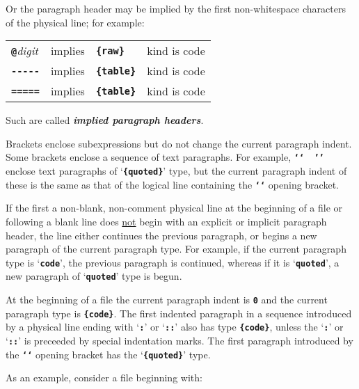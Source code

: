 \documentclass[12pt]{article}
\newcommand{\TT}[1]{{\tt \bfseries #1}}
\newcommand{\skey}[2]{{\bf \em #1#2}\index{#1}}
\begin{document}
Or the paragraph header may be implied by the first non-whitespace
characters of the physical line; for example:
\begin{center}
\begin{tabular}{llll}
\TT{*@}{\em digit}	& implies	& \TT{\{raw\}} 	  & kind is code \\
\TT{-{}-{}-{}-{}-}	& implies	& \TT{\{table\}}  & kind is code \\
\TT{={}={}={}={}=}	& implies	& \TT{\{table\}}  & kind is code \\
\end{tabular}
\end{center}
Such are called \skey{implied paragraph header}s.

Brackets enclose subexpressions but do not
change the current paragraph indent.
Some brackets enclose a sequence of text paragraphs.
For example, \TT{`{}`~~'{}'} enclose text paragraphs
of `\TT{\{quoted\}}' type, but the current paragraph
indent of these is the same as that of the logical line
containing the \TT{`{}`} opening bracket.

If the first
a non-blank, non-comment physical line at the beginning of a file
or following a blank line does \underline{not} begin with an explicit
or implicit paragraph header, the line either continues the previous
paragraph,
or begins a new paragraph of the current paragraph type.
For example, if the current paragraph type is `\TT{code}',
the previous paragraph is continued, whereas if it is `\TT{quoted}',
a new paragraph of `\TT{quoted}' type is begun.

At the beginning of a file the current paragraph indent is \TT{0}
and the current paragraph type is \TT{\{code\}}.
The first indented paragraph in a sequence introduced by a physical
line ending with `\TT{:}' or `\TT{::}' also has type \TT{\{code\}}, unless the
`\TT{:}' or `\TT{::}' is preceeded by special indentation marks.
The first paragraph introduced by the \TT{`{}`} opening bracket has
the `\TT{\{quoted\}}' type.

As an example, consider a file beginning with:
\end{document}
